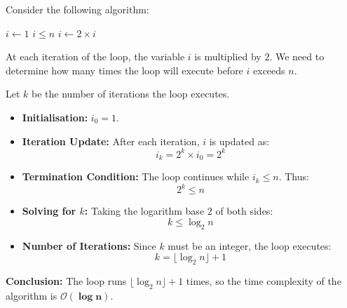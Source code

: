 \begin{example}

    Consider the following algorithm:
    
    \begin{codebox}
        \li $i \gets 1$
        \li \While $i \leq n$ \Do
        \li     $i \gets 2 \times i$
            \End
    \end{codebox}
    
    At each iteration of the \texttt{\While} loop, the variable $i$ is multiplied by $2$. We need to determine how many times the loop will execute before $i$ exceeds $n$.
    
    Let $k$ be the number of iterations the loop executes.
    
    \begin{itemize}
        \item \textbf{Initialisation:} $i_0 = 1$.
        \item \textbf{Iteration Update:} After each iteration, $i$ is updated as:
        \[ i_k = 2^k \times i_0 = 2^k \]
        \item \textbf{Termination Condition:} The loop continues while $i_k \leq n$. Thus:
        \[ 2^k \leq n \]
        \item \textbf{Solving for $k$:} Taking the logarithm base $2$ of both sides:
        \[ k \leq \log_2 n \]
        \item \textbf{Number of Iterations:} Since $k$ must be an integer, the loop executes:
        \[ k = \lfloor \log_2 n \rfloor + 1 \]
    \end{itemize}
    
    \textbf{Conclusion:} The loop runs $\lfloor \log_2 n \rfloor + 1$ times, so the time complexity of the algorithm is $\boldsymbol{\mathcal{O}(\log n)}$.
            
\end{example}
            
